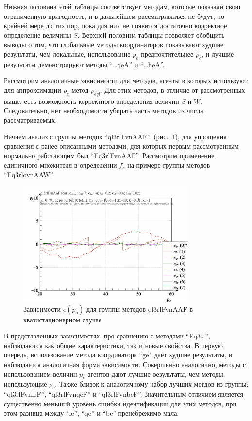 Нижняя половина этой таблицы соответствует методам,
которые показали свою ограниченную пригодность, и в дальнейшем
рассматриваться не будут, по крайней мере до тих пор,
пока для них не появится достаточно корректное определение величины $S$.
Верхней половина таблицы позволяет обобщить выводы о том, что
глобальные методы координаторов показывают худшие результаты, чем локальные,
использование $p_e$ предпочтительнее $p_c$,
и лучшие результаты демонстрируют методы ``\ldots qeA''  и ``\ldots beA''.

Рассмотрим аналогичные зависимости для методов, агенты в которых
используют для аппроксимации $p_e$ метод $p_{eql}$.
Для этих методов, в отличие от рассмотренных выше,
есть возможность корректного определения величин $S$ и $W$.
Следовательно, нет необходимости убирать часть методов из числа рассматриваемых.

Начнём анализ с группы методов ``ql3rlFvnAAF''~(рис.~\ref{atu:f:ql3rlFvnAAF_scan}), для упрощения сравнения
с ранее описанными методами, для которых первым рассмотренным нормально работающим был ``Fq3rlFvnAAF''.
Рассмотрим применение единичного множителя в определении $f_e$ на примере группы методов ``Fq3rlovnAAW''.

\begin{figure}[htb!]
  \centerline{
    \includegraphics[width=0.8\textwidth]{p/scan/qls-p_p_e_ql3rlFvnAAF_scan.png}
  }
  \caption{Зависимости $e(p_o)$ для группы методов ql3rlFvnAAF в квазистационарном случае}
  \label{atu:f:ql3rlFvnAAF_scan}
\end{figure}

В представленных зависимостях, про сравнению с методами ``Fq3\ldots'', наблюдаются
как общие характеристики, так и новые свойства. В первую очередь,
использование метода координатора ``ge'' даёт худшие результаты,
и наблюдается аналогичная форма зависимости.
Совершенно аналогично, методы с использованием величин $p_e$ агентов
дают лучшие оезультаты, чем методы,  использующие $p_c$.
Также близок к аналогичному набор лучших метдов из группы:
``ql3rlFvnleF'', ``ql3rlFvnqeF'' и ``ql3rlFvnbeF''.
Значительным отличием является существенно меньший уровень ошибки
идентификации для этих методов, при этом разница между
``le'', ``qe'' и ``be'' пренебрежимо мала.


